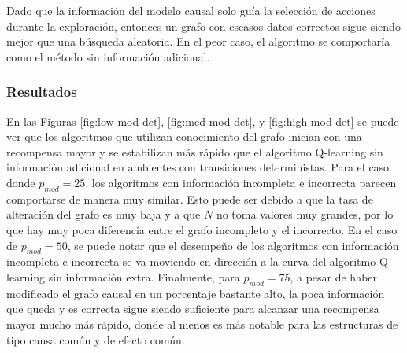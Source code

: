 Dado que la información del modelo causal solo guía la selección
de acciones durante la exploración, entonces un grafo con escasos
datos correctos sigue siendo mejor que una búsqueda aleatoria. En el
peor caso, el algoritmo se comportaría como el método sin información adicional.


\subsubsection{Resultados}

En las Figuras \ref{fig:low-mod-det}, \ref{fig:med-mod-det}, y \ref{fig:high-mod-det} se puede ver que los algoritmos que utilizan conocimiento del grafo inician con una recompensa mayor y se estabilizan más rápido que el algoritmo Q-learning
sin información adicional en ambientes con transiciones deterministas. Para el caso donde $p_{mod} = 25$, los algoritmos con información incompleta e incorrecta parecen 
comportarse de manera muy similar. Esto puede ser debido 
a que la tasa de alteración del grafo es muy baja y  a que $N$ no toma
valores muy grandes, por lo que hay muy poca diferencia entre el grafo incompleto y el incorrecto. 
En el caso de $p_{mod} = 50$, se
puede notar que el desempeño de los algoritmos
con información incompleta e incorrecta se 
va moviendo en dirección a la curva del algoritmo
Q-learning sin información extra.
Finalmente, para $p_{mod} = 75$,  a pesar de haber modificado el grafo 
causal en un porcentaje bastante alto, la poca información que queda y es correcta sigue siendo suficiente para alcanzar una recompensa mayor mucho más rápido, donde al menos es más notable para las estructuras de tipo causa común y de efecto común.


